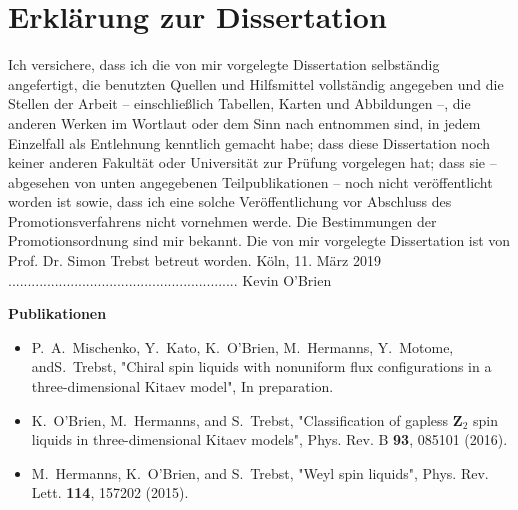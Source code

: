 \chapter*{Erkl\"{a}rung zur Dissertation}
\singlespacing
Ich versichere, dass ich die von mir vorgelegte Dissertation selbst\"{a}ndig angefertigt, die benutzten Quellen und Hilfsmittel vollst\"{a}ndig angegeben und die Stellen der Arbeit -- einschlie\ss lich Tabellen, Karten und Abbildungen --, die anderen Werken im Wortlaut oder dem Sinn nach entnommen sind, in jedem Einzelfall als Entlehnung kenntlich gemacht habe; dass diese Dissertation noch keiner anderen Fakult\"{a}t oder Universit\"{a}t zur Pr\"{u}fung vorgelegen hat; dass sie -- abgesehen von unten angegebenen Teilpublikationen -- noch nicht ver\"{o}ffentlicht worden ist sowie, dass ich eine solche Ver\"{o}ffentlichung vor Abschluss des Promotionsverfahrens nicht vornehmen werde. Die Bestimmungen der Promotionsordnung sind mir bekannt. Die von mir vorgelegte Dissertation ist von Prof. Dr. Simon Trebst betreut worden.
\vspace{2cm}\newline
K\"oln, 11. M\"{a}rz 2019
\hspace{3.2cm}
...........................................................\newline
{}
\hspace{3.2cm}
Kevin O'Brien


\vspace{2cm}
\noindent
{\huge\textbf{Publikationen}}
\newline
%
%
\begin{itemize}
	\item
		P.~A.~Mischenko, Y.~Kato, K.~O'Brien, M.~Hermanns, Y.~Motome, and\linebreak S.~Trebst, "Chiral spin liquids with nonuniform flux configurations in a three-dimensional Kitaev model", In preparation.
		
	\item
		K.~O'Brien, M.~Hermanns, and S.~Trebst, "Classification of gapless $\mathbf{Z}_2$ spin liquids in three-dimensional Kitaev models", Phys. Rev. B \textbf{93}, 085101 (2016).
		
	\item
		M.~Hermanns, K.~O'Brien, and S.~Trebst, "Weyl spin liquids", Phys. Rev. Lett. \textbf{114}, 157202 (2015).
\end{itemize}